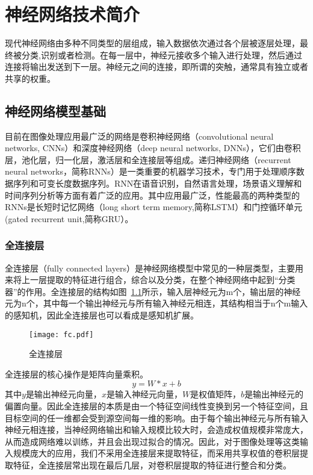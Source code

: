 \chapter{神经网络技术简介}

现代神经网络由多种不同类型的层组成，输入数据依次通过各个层被逐层处理，最终被分类,识别或者检测。在每一层中，神经元接收多个输入进行处理，然后通过连接将输出发送到下一层。神经元之间的连接，即所谓的突触，通常具有独立或者共享的权重。



\section{神经网络模型基础}
目前在图像处理应用最广泛的网络是卷积神经网络（convolutional neural networks, CNNs）和深度神经网络（deep neural networks, DNNs），它们由卷积层，池化层，归一化层，激活层和全连接层等组成。递归神经网络（recurrent neural networks，简称RNNs）是一类重要的机器学习技术，专门用于处理顺序数据序列和可变长度数据序列。RNN在语音识别，自然语言处理，场景语义理解和时间序列分析等方面有着广泛的应用。其中应用最广泛，性能最高的两种类型的RNNs是长短时记忆网络（long short term memory,简称LSTM）和门控循环单元(gated recurrent unit,简称GRU）。

\subsection{全连接层}
全连接层（fully connected layers）是神经网络模型中常见的一种层类型，主要用来将上一层提取的特征进行组合，综合以及分类，在整个神经网络中起到“分类器”的作用。全连接层的结构如图~\ref{fig:fc_layer}所示，输入层神经元为m个，输出层的神经元为n个，其中每一个输出神经元与所有输入神经元相连，其结构相当于n个m输入的感知机，因此全连接层也可以看成是感知机扩展。 
\begin{figure}
  \centering
  \texttt{[image: fc.pdf]}
  \caption{\footnotesize 全连接层}
  \label{fig:fc_layer}
\end{figure}


全连接层的核心操作是矩阵向量乘积。
\begin{equation}
y=W*x+b
\end{equation}
其中$y$是输出神经元向量，$x$是输入神经元向量，$W$是权值矩阵，$b$是输出神经元的偏置向量。因此全连接层的本质是由一个特征空间线性变换到另一个特征空间，且目标空间的任一维都会受到源空间每一维的影响。由于每个输出神经元与所有输入神经元相连接，当神经网络输出和输入规模比较大时，会造成权值规模非常庞大，从而造成网络难以训练，并且会出现过拟合的情况。因此，对于图像处理等这类输入规模庞大的应用，我们不采用全连接层来提取特征，而采用共享权值的卷积层提取特征，全连接层常出现在最后几层，对卷积层提取的特征进行整合和分类。


